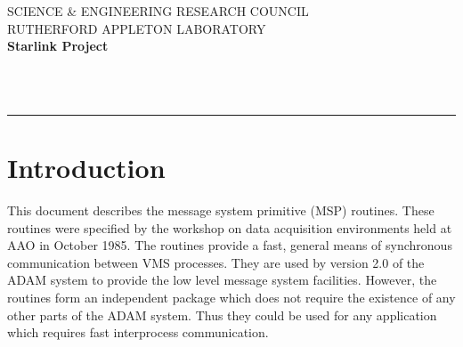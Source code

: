 \def\mansemiverbatim{\zmansemiverbatim\frenchspacing\zvobeyspaces}

\let\endmansemiverbatim=\endtrivlist


\thispagestyle{empty}
SCIENCE \& ENGINEERING RESEARCH COUNCIL \hfill \stardocname\\
RUTHERFORD APPLETON LABORATORY\\
{\large\bf Starlink Project\\}
{\large\bf \stardoccategory\ \stardocnumber}
\begin{flushright}
\stardocauthors\\
\stardocdate
\end{flushright}
\vspace{-4mm}
\rule{\textwidth}{0.5mm}
\vspace{5mm}
\begin{center}
{\Large\bf \stardoctitle}
\end{center}
\vspace{5mm}

\setlength{\parskip}{0mm}
\tableofcontents
\setlength{\parskip}{\medskipamount}
\markright{\stardocname}
\newenvironment{cozy}[1]%
{\begin{list}{}{%
\settowidth{\labelwidth}{\large\tt #1}%
\setlength{\labelsep}{5mm}%
\setlength{\leftmargin}{\labelwidth}\addtolength{\leftmargin}{\labelsep}%
\setlength{\parsep}{\medskipamount}%
}}{\end{list}}
\newpage
\section{Introduction}

This document describes the message system primitive (MSP) routines.
These routines were specified by the workshop on data acquisition environments
held at AAO in October 1985. The routines provide a fast, general means of
synchronous communication between VMS processes. They are used by version
2.0 of the ADAM system to provide the low level message system facilities.
However, the routines form an independent package which does not require
the existence of any other parts of the ADAM system. Thus they could be used 
for any application which requires fast interprocess communication.

